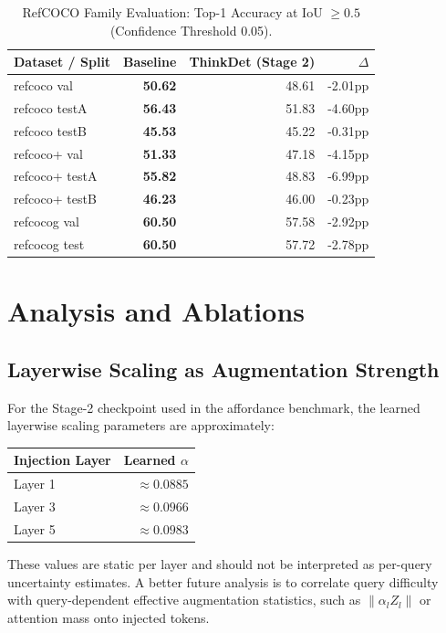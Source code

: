 \documentclass{uai2026} %
\begin{document}
\begin{table}[t]
\centering
\caption{RefCOCO Family Evaluation: Top-1 Accuracy at IoU \(\geq 0.5\) (Confidence Threshold 0.05).}
\label{tab:refcoco}
\begin{tabular}{lrrr}
\toprule
Dataset / Split & Baseline & ThinkDet (Stage 2) & \(\Delta\) \\
\midrule
refcoco val   & \textbf{50.62} & 48.61 & -2.01pp \\
refcoco testA & \textbf{56.43} & 51.83 & -4.60pp \\
refcoco testB & \textbf{45.53} & 45.22 & -0.31pp \\
refcoco+ val   & \textbf{51.33} & 47.18 & -4.15pp \\
refcoco+ testA & \textbf{55.82} & 48.83 & -6.99pp \\
refcoco+ testB & \textbf{46.23} & 46.00 & -0.23pp \\
refcocog val  & \textbf{60.50} & 57.58 & -2.92pp \\
refcocog test & \textbf{60.50} & 57.72 & -2.78pp \\
\bottomrule
\end{tabular}
\end{table}

\section{Analysis and Ablations}\label{sec:analysis}
\subsection{Layerwise Scaling as Augmentation Strength}
For the Stage-2 checkpoint used in the affordance benchmark, the learned layerwise scaling parameters are approximately:
\begin{center}
\begin{tabular}{lr}
\toprule
Injection Layer & Learned \(\alpha\) \\
\midrule
Layer 1 & \(\approx 0.0885\) \\
Layer 3 & \(\approx 0.0966\) \\
Layer 5 & \(\approx 0.0983\) \\
\bottomrule
\end{tabular}
\end{center}

These values are static per layer and should not be interpreted as per-query uncertainty estimates. A better future analysis is to correlate query difficulty with query-dependent effective augmentation statistics, such as \(\lVert \alpha_l Z_l \rVert\) or attention mass onto injected tokens.
\end{document}
